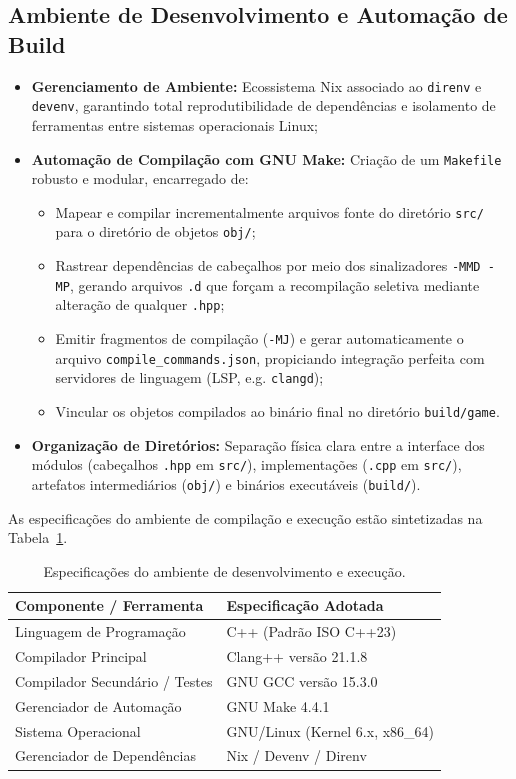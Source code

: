 \documentclass[12pt,a4paper]{article}
\begin{document}
\subsection{Ambiente de Desenvolvimento e Automação de Build}
\begin{itemize}
    \item \textbf{Gerenciamento de Ambiente:} Ecossistema Nix associado ao \texttt{direnv} e \texttt{devenv}, garantindo total reprodutibilidade de dependências e isolamento de ferramentas entre sistemas operacionais Linux;
    \item \textbf{Automação de Compilação com GNU Make:} Criação de um \texttt{Makefile} robusto e modular, encarregado de:
    \begin{itemize}
        \item Mapear e compilar incrementalmente arquivos fonte do diretório \texttt{src/} para o diretório de objetos \texttt{obj/};
        \item Rastrear dependências de cabeçalhos por meio dos sinalizadores \texttt{-MMD -MP}, gerando arquivos \texttt{.d} que forçam a recompilação seletiva mediante alteração de qualquer \texttt{.hpp};
        \item Emitir fragmentos de compilação (\texttt{-MJ}) e gerar automaticamente o arquivo \texttt{compile\_commands.json}, propiciando integração perfeita com servidores de linguagem (LSP, e.g. \texttt{clangd});
        \item Vincular os objetos compilados ao binário final no diretório \texttt{build/game}.
    \end{itemize}
    \item \textbf{Organização de Diretórios:} Separação física clara entre a interface dos módulos (cabeçalhos \texttt{.hpp} em \texttt{src/}), implementações (\texttt{.cpp} em \texttt{src/}), artefatos intermediários (\texttt{obj/}) e binários executáveis (\texttt{build/}).
\end{itemize}

As especificações do ambiente de compilação e execução estão sintetizadas na Tabela~\ref{tab:ambiente}.

\begin{table}[H]
\centering
\caption{Especificações do ambiente de desenvolvimento e execução.}
\label{tab:ambiente}
\begin{tabular}{p{} p{}}
\toprule
\textbf{Componente / Ferramenta} & \textbf{Especificação Adotada} \\
\midrule
Linguagem de Programação & C++ (Padrão ISO C++23) \\
Compilador Principal & Clang++ versão 21.1.8 \\
Compilador Secundário / Testes & GNU GCC versão 15.3.0 \\
Gerenciador de Automação & GNU Make 4.4.1 \\
Sistema Operacional & GNU/Linux (Kernel 6.x, x86\_64) \\
Gerenciador de Dependências & Nix / Devenv / Direnv \\
\bottomrule
\end{tabular}
\end{table}
\end{document}
